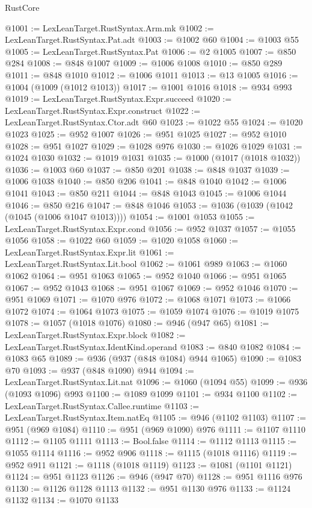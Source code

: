 \begin{lexlean}{RustCore}
\begin{coremodule}
@1001 := LexLeanTarget.RustSyntax.Arm.mk
@1002 := LexLeanTarget.RustSyntax.Pat.adt
@1003 := @1002 @60
@1004 := @1003 @55
@1005 := LexLeanTarget.RustSyntax.Pat
@1006 := @2 @1005
@1007 := @850 @284
@1008 := @848 @1007
@1009 := @1006 @1008
@1010 := @850 @289
@1011 := @848 @1010
@1012 := @1006 @1011
@1013 := @13 @1005
@1016 := @1004 (@1009 (@1012 @1013))
@1017 := @1001 @1016
@1018 := @934 @993
@1019 := LexLeanTarget.RustSyntax.Expr.succeed
@1020 := LexLeanTarget.RustSyntax.Expr.construct
@1022 := LexLeanTarget.RustSyntax.Ctor.adt @60
@1023 := @1022 @55
@1024 := @1020 @1023
@1025 := @952 @1007
@1026 := @951 @1025
@1027 := @952 @1010
@1028 := @951 @1027
@1029 := @1028 @976
@1030 := @1026 @1029
@1031 := @1024 @1030
@1032 := @1019 @1031
@1035 := @1000 (@1017 (@1018 @1032))
@1036 := @1003 @60
@1037 := @850 @201
@1038 := @848 @1037
@1039 := @1006 @1038
@1040 := @850 @206
@1041 := @848 @1040
@1042 := @1006 @1041
@1043 := @850 @211
@1044 := @848 @1043
@1045 := @1006 @1044
@1046 := @850 @216
@1047 := @848 @1046
@1053 := @1036 (@1039 (@1042 (@1045 (@1006 @1047 @1013))))
@1054 := @1001 @1053
@1055 := LexLeanTarget.RustSyntax.Expr.cond
@1056 := @952 @1037
@1057 := @1055 @1056
@1058 := @1022 @60
@1059 := @1020 @1058
@1060 := LexLeanTarget.RustSyntax.Expr.lit
@1061 := LexLeanTarget.RustSyntax.Lit.bool
@1062 := @1061 @989
@1063 := @1060 @1062
@1064 := @951 @1063
@1065 := @952 @1040
@1066 := @951 @1065
@1067 := @952 @1043
@1068 := @951 @1067
@1069 := @952 @1046
@1070 := @951 @1069
@1071 := @1070 @976
@1072 := @1068 @1071
@1073 := @1066 @1072
@1074 := @1064 @1073
@1075 := @1059 @1074
@1076 := @1019 @1075
@1078 := @1057 (@1018 @1076)
@1080 := @946 (@947 @65)
@1081 := LexLeanTarget.RustSyntax.Expr.block
@1082 := LexLeanTarget.RustSyntax.IdentKind.operand
@1083 := @840 @1082
@1084 := @1083 @65
@1089 := @936 (@937 (@848 @1084) @944 @1065)
@1090 := @1083 @70
@1093 := @937 (@848 @1090) @944
@1094 := LexLeanTarget.RustSyntax.Lit.nat
@1096 := @1060 (@1094 @55)
@1099 := @936 (@1093 @1096) @993
@1100 := @1089 @1099
@1101 := @934 @1100
@1102 := LexLeanTarget.RustSyntax.Callee.runtime
@1103 := LexLeanTarget.RustSyntax.Item.natEq
@1105 := @946 (@1102 @1103)
@1107 := @951 (@969 @1084)
@1110 := @951 (@969 @1090) @976
@1111 := @1107 @1110
@1112 := @1105 @1111
@1113 := Bool.false
@1114 := @1112 @1113
@1115 := @1055 @1114
@1116 := @952 @906
@1118 := @1115 (@1018 @1116)
@1119 := @952 @911
@1121 := @1118 (@1018 @1119)
@1123 := @1081 (@1101 @1121)
@1124 := @951 @1123
@1126 := @946 (@947 @70)
@1128 := @951 @1116 @976
@1130 := @1126 @1128 @1113
@1132 := @951 @1130 @976
@1133 := @1124 @1132
@1134 := @1070 @1133

\end{coremodule}
\end{lexlean}
